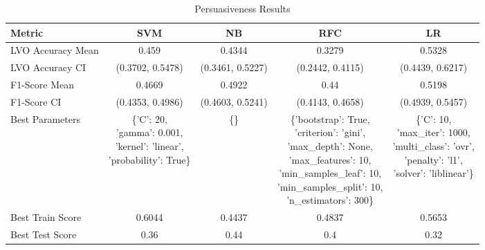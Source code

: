 \begin{table}[h!]
\centering
\begin{tabular}{|l|c|c|c|c|}
\hline
\textbf{Metric}           & \textbf{SVM}    & \textbf{NB}     & \textbf{RFC}    & \textbf{LR}     \\ \hline
LVO Accuracy Mean         & 0.459           & 0.4344          & 0.3279          & 0.5328          \\ \hline
LVO Accuracy CI           & (0.3702, 0.5478)& (0.3461, 0.5227)& (0.2442, 0.4115)& (0.4439, 0.6217)\\ \hline
F1-Score Mean             & 0.4669          & 0.4922          & 0.44            & 0.5198          \\ \hline
F1-Score CI               & (0.4353, 0.4986)& (0.4603, 0.5241)& (0.4143, 0.4658)& (0.4939, 0.5457)\\ \hline
Best Parameters           & \makecell[l]{\{'C': 20,\\ 'gamma': 0.001,\\ 'kernel': 'linear',\\ 'probability': True\}} & \{\} & \makecell[l]{\{'bootstrap': True,\\ 'criterion': 'gini',\\ 'max\_depth': None,\\ 'max\_features': 10,\\ 'min\_samples\_leaf': 10,\\ 'min\_samples\_split': 10,\\ 'n\_estimators': 300\}} & \makecell[l]{\{'C': 10,\\ 'max\_iter': 1000,\\ 'multi\_class': 'ovr',\\ 'penalty': 'l1',\\ 'solver': 'liblinear'\}} \\ \hline
Best Train Score          & 0.6044          & 0.4437          & 0.4837          & 0.5653          \\ \hline
Best Test Score           & 0.36            & 0.44            & 0.4             & 0.32            \\ \hline
\end{tabular}
\caption{Persuasiveness Results}
\label{table:persuasiveness1}
\end{table}

